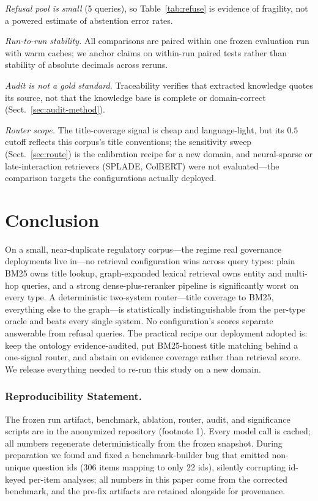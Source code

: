 \documentclass[runningheads]{llncs}
\begin{document}
\emph{Refusal pool is small} (5 queries), so Table~\ref{tab:refuse} is
evidence of fragility, not a powered estimate of abstention error rates.

\emph{Run-to-run stability.} All comparisons are paired within one frozen
evaluation run with warm caches; we anchor claims on within-run paired tests
rather than stability of absolute decimals across reruns.

\emph{Audit is not a gold standard.} Traceability verifies that extracted
knowledge quotes its source, not that the knowledge base is complete or
domain-correct (Sect.~\ref{sec:audit-method}).

\emph{Router scope.} The title-coverage signal is cheap and language-light,
but its $0.5$ cutoff reflects this corpus's title conventions; the sensitivity
sweep (Sect.~\ref{sec:route}) is the calibration recipe for a new domain, and
neural-sparse or late-interaction retrievers (SPLADE, ColBERT) were not
evaluated---the comparison targets the configurations actually deployed.

\section{Conclusion}
\label{sec:conclusion}

On a small, near-duplicate regulatory corpus---the regime real governance
deployments live in---no retrieval configuration wins across query types:
plain BM25 owns title lookup, graph-expanded lexical retrieval owns entity
and multi-hop queries, and a strong dense-plus-reranker pipeline is
significantly worst on every type. A deterministic two-system router---title
coverage to BM25, everything else to the graph---is statistically
indistinguishable from the per-type oracle and beats every single system.
No configuration's scores separate answerable from refusal queries. The
practical recipe our deployment adopted is: keep the ontology
evidence-audited, put BM25-honest title matching behind a one-signal router,
and abstain on evidence coverage rather than retrieval score. We release
everything needed to re-run this study on a new domain.

\subsubsection*{Reproducibility Statement.} The frozen run artifact,
benchmark, ablation, router, audit, and significance scripts are in the
anonymized repository (footnote 1). Every model call is cached; all numbers
regenerate deterministically from the frozen snapshot. During preparation we
found and fixed a benchmark-builder bug that emitted non-unique question ids
(306 items mapping to only 22 ids), silently corrupting id-keyed per-item
analyses; all numbers in this paper come from the corrected benchmark, and
the pre-fix artifacts are retained alongside for provenance.
\end{document}
